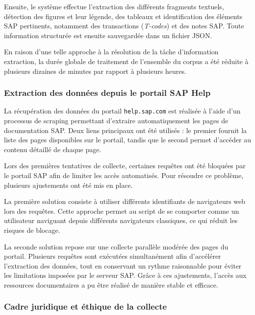 Ensuite, le système effectue l'extraction des différents fragments textuels, détection des figures et leur légende, des tableaux et identification des éléments SAP pertinents, notamment des  transactions (\textit{T-codes}) et des notes SAP. Toute information structurée est ensuite sauvegardée dans un fichier JSON.

En raison d'une telle approche à la résolution de la tâche d'information extraction, la durée globale de traitement de l'ensemble du corpus a été réduite à plusieurs dizaines de minutes par rapport à plusieurs heures.


\subsubsection{Extraction des données depuis le portail SAP Help}

La récupération des données du portail \texttt{help.sap.com} est réalisée à l’aide d’un processus de scraping permettant d’extraire automatiquement les pages de documentation SAP. Deux liens principaux ont été utilisés : le premier fournit la liste des pages disponibles sur le portail, tandis que le second permet d’accéder au contenu détaillé de chaque page.

Lors des premières tentatives de collecte, certaines requêtes ont été bloquées par le portail SAP afin de limiter les accès automatisés. Pour résoudre ce problème, plusieurs ajustements ont été mis en place.

La première solution consiste à utiliser différents identifiants de navigateurs web lors des requêtes. Cette approche permet au script de se comporter comme un utilisateur naviguant depuis différents navigateurs classiques, ce qui réduit les risques de blocage.

La seconde solution repose sur une collecte parallèle modérée des pages du portail. Plusieurs requêtes sont exécutées simultanément afin d’accélérer l’extraction des données, tout en conservant un rythme raisonnable pour éviter les limitations imposées par le serveur SAP. Grâce à ces ajustements, l’accès aux ressources documentaires a pu être réalisé de manière stable et efficace.

\subsubsection{Cadre juridique et éthique de la collecte}

